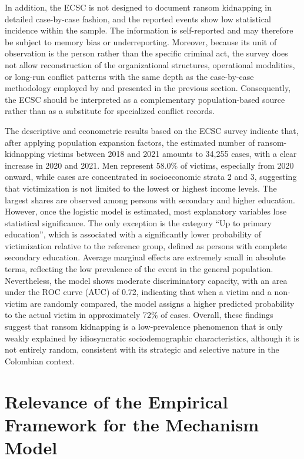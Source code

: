 \documentclass[12pt,a4paper]{article}
\providecommand{\textcite}{\citet}
\theoremstyle{plain}
\theoremstyle{definition}
\theoremstyle{remark}
\newcommand{\1}{\mathbf{1}}
\begin{document}
In addition, the ECSC is not designed to document ransom kidnapping in detailed case-by-case fashion, and the reported events show low statistical incidence within the sample. The information is self-reported and may therefore be subject to memory bias or underreporting. Moreover, because its unit of observation is the person rather than the specific criminal act, the survey does not allow reconstruction of the organizational structures, operational modalities, or long-run conflict patterns with the same depth as the case-by-case methodology employed by \textcite{cnmh_datos} and presented in the previous section. Consequently, the ECSC should be interpreted as a complementary population-based source rather than as a substitute for specialized conflict records.

The descriptive and econometric results based on the ECSC survey indicate that, after applying population expansion factors, the estimated number of ransom-kidnapping victims between 2018 and 2021 amounts to 34,255 cases, with a clear increase in 2020 and 2021. Men represent 58.0\% of victims, especially from 2020 onward, while cases are concentrated in socioeconomic strata 2 and 3, suggesting that victimization is not limited to the lowest or highest income levels. The largest shares are observed among persons with secondary and higher education. However, once the logistic model is estimated, most explanatory variables lose statistical significance. The only exception is the category ``Up to primary education'', which is associated with a significantly lower probability of victimization relative to the reference group, defined as persons with complete secondary education. Average marginal effects are extremely small in absolute terms, reflecting the low prevalence of the event in the general population. Nevertheless, the model shows moderate discriminatory capacity, with an area under the ROC curve (AUC) of 0.72, indicating that when a victim and a non-victim are randomly compared, the model assigns a higher predicted probability to the actual victim in approximately 72\% of cases. Overall, these findings suggest that ransom kidnapping is a low-prevalence phenomenon that is only weakly explained by idiosyncratic sociodemographic characteristics, although it is not entirely random, consistent with its strategic and selective nature in the Colombian context.

\section{Relevance of the Empirical Framework for the Mechanism Model}
\label{sec:pertinencia}
\end{document}
